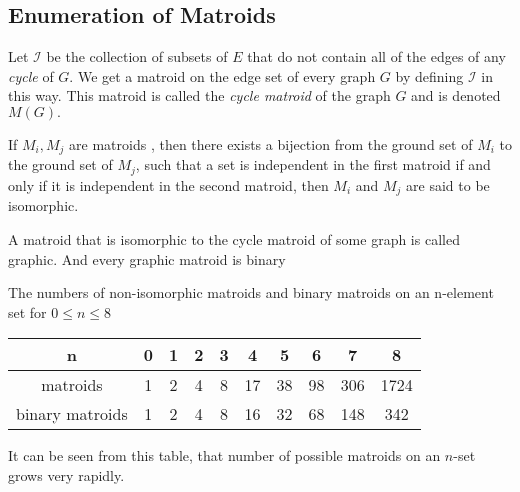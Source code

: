 \documentclass[../main.tex]{subfiles}
\begin{document}
\subsection{Enumeration of Matroids}
\begin{defn}
Let $\mathcal{I}$ be the collection of subsets of $E$ that do not contain all of the edges of any \textit{cycle} of $G.$
We get a matroid on the edge set of every graph $G$ by defining $\mathcal{I}$ in this way. This matroid is called the \textit{cycle matroid} of the graph $G$ and is denoted $M(G).$
\end{defn}

\begin{defn}
If $M_i, M_j$ are matroids , then there exists a bijection from the ground set of $M_i$ to the ground set of $M_j$, such that a set is independent in the first matroid if and only if it is independent in the second matroid, then $M_i$ and $M_j$ are said to be isomorphic. 
\end{defn}

\begin{note}
A matroid that is isomorphic to the cycle matroid of some graph is called graphic.
And every graphic matroid is binary
\end{note}

\noindent The numbers of non-isomorphic matroids and binary matroids on an n-element set for $0 \leq n \leq  8$
\begin{center}
 \begin{tabular}{| c c c c c c c c c c |} 
 \hline
 n & 0 & 1 & 2 & 3 & 4 & 5 & 6 & 7 & 8 \\ [0.5ex] 
 \hline\hline
 matroids & 1 & 2 & 4 & 8 & 17 & 38 & 98 & 306 & 1724\\ 
 \hline
 binary matroids & 1 & 2 & 4 & 8 & 16 & 32 & 68 & 148 & 342\\
 \hline
\end{tabular}
\end{center}
It can be seen from this table, that number of possible matroids on an $n$-set grows very rapidly.
\end{document}
